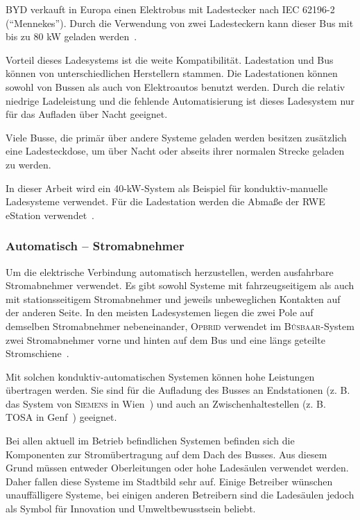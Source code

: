 \textsc{BYD} verkauft in Europa einen Elektrobus mit Ladestecker nach IEC 62196-2 ("`Mennekes"'). Durch die Verwendung von zwei Ladesteckern kann dieser Bus mit bis zu 80 kW geladen werden~\cite{bydSpecs4}.

Vorteil dieses Ladesystems ist die weite Kompatibilität. Ladestation und Bus können von unterschiedlichen Herstellern stammen. Die Ladestationen können sowohl von Bussen als auch von Elektroautos benutzt werden. Durch die relativ niedrige Ladeleistung und die fehlende Automatisierung ist dieses Ladesystem nur für das Aufladen über Nacht geeignet.

Viele Busse, die primär über andere Systeme geladen werden besitzen zusätzlich eine Ladesteckdose, um über Nacht oder abseits ihrer normalen Strecke geladen zu werden.

In dieser Arbeit wird ein 40-kW-System als Beispiel für konduktiv-manuelle Ladesysteme verwendet. Für die Ladestation werden die Abmaße der RWE eStation verwendet~\cite{rweKonMan}.

\subsubsection{Automatisch – Stromabnehmer}
Um die elektrische Verbindung automatisch herzustellen, werden ausfahrbare Stromabnehmer verwendet. Es gibt sowohl Systeme mit fahrzeugseitigem als auch mit stationsseitigem Stromabnehmer und jeweils unbeweglichen Kontakten auf der anderen Seite. In den meisten Ladesystemen liegen die zwei Pole auf demselben Stromabnehmer nebeneinander, \textsc{Opbrid} verwendet im \textsc{Bůsbaar}-System zwei Stromabnehmer vorne und hinten auf dem Bus und eine längs geteilte Stromschiene~\cite{SchKonLade}.

Mit solchen konduktiv-automatischen Systemen können hohe Leistungen übertragen werden. Sie sind für die Aufladung des Busses an Endstationen (z. B. das System von \textsc{Siemens} in Wien~\cite{SiemensWien}) und auch an Zwischenhaltestellen (z. B. \textsc{TOSA} in Genf~\cite{tosa}) geeignet. 

Bei allen aktuell im Betrieb befindlichen Systemen befinden sich die Komponenten zur Stromübertragung auf dem Dach des Busses. Aus diesem Grund müssen entweder Oberleitungen oder hohe Ladesäulen verwendet werden. Daher fallen diese Systeme im Stadtbild sehr auf. Einige Betreiber wünschen unauffälligere Systeme, bei einigen anderen Betreibern sind die Ladesäulen jedoch als Symbol für Innovation und Umweltbewusstsein beliebt.

